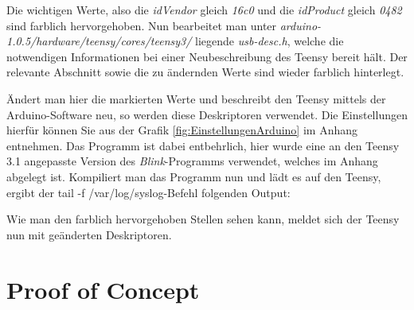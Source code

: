 \lstset{language=log}


Die wichtigen Werte, also die \textit{idVendor} gleich \textit{16c0} und die \textit{idProduct} gleich \textit{0482} sind farblich hervorgehoben. Nun bearbeitet man unter \textit{arduino-1.0.5/hardware/teensy/cores/teensy3/} liegende \textit{usb-desc.h}, welche die notwendigen Informationen bei einer Neubeschreibung des Teensy bereit hält. Der relevante Abschnitt sowie die zu ändernden Werte sind wieder farblich hinterlegt.

\lstset{language=C}


Ändert man hier die markierten Werte und beschreibt den Teensy mittels der Arduino-Software neu, so werden diese Deskriptoren verwendet. Die Einstellungen hierfür können Sie aus der Grafik \ref{fig:EinstellungenArduino} im Anhang entnehmen. Das Programm ist dabei entbehrlich, hier wurde eine an den Teensy 3.1 angepasste Version des \textit{Blink}-Programms verwendet, welches im Anhang abgelegt ist. Kompiliert man das Programm nun und lädt es auf den Teensy, ergibt der \glqq tail -f /var/log/syslog\grqq -Befehl folgenden Output:

\lstset{language=log}


Wie man den farblich hervorgehoben Stellen sehen kann, meldet sich der Teensy nun mit geänderten Deskriptoren.

\section{Proof of Concept} \label{PoC}